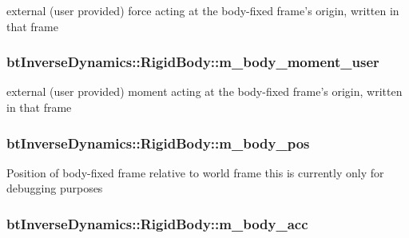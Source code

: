 external (user provided) force acting at the body-fixed frame's origin, written in that frame \hypertarget{structbt_inverse_dynamics_1_1_rigid_body_2525b72b49dff7c73e9d4056e6e13411}{
\subsubsection[m\_\-body\_\-moment\_\-user]{ {\bf btInverseDynamics::RigidBody::m\_\-body\_\-moment\_\-user}}}
\label{structbt_inverse_dynamics_1_1_rigid_body_2525b72b49dff7c73e9d4056e6e13411}


external (user provided) moment acting at the body-fixed frame's origin, written in that frame \hypertarget{structbt_inverse_dynamics_1_1_rigid_body_be1a189ee858529b691fe72beb819e5f}{
\subsubsection[m\_\-body\_\-pos]{ {\bf btInverseDynamics::RigidBody::m\_\-body\_\-pos}}}
\label{structbt_inverse_dynamics_1_1_rigid_body_be1a189ee858529b691fe72beb819e5f}


Position of body-fixed frame relative to world frame this is currently only for debugging purposes \hypertarget{structbt_inverse_dynamics_1_1_rigid_body_67bb39b2dbbd0180395b251bdbae00c7}{
\subsubsection[m\_\-body\_\-acc]{ {\bf btInverseDynamics::RigidBody::m\_\-body\_\-acc}}}
\label{structbt_inverse_dynamics_1_1_rigid_body_67bb39b2dbbd0180395b251bdbae00c7}


